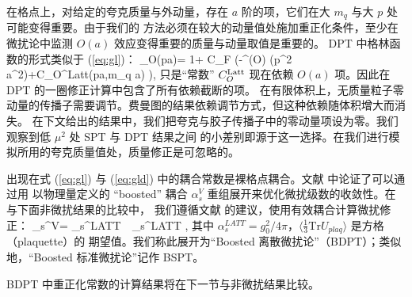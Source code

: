 在格点上，对给定的夸克质量与外动量，存在 $a$ 阶的项，它们在大 $m_q$ 与大 $p$ 处可能变得重要。由于我们的
方法必须在较大的动量值处施加重正化条件，至少在微扰论中监测 $O(a)$ 效应变得重要的质量与动量取值是重要的。
DPT 中格林函数的形式类似于 (\ref{eq:gl})：
\beq \Gamma_O(pa)=
  1+ C_F
\Bigl(-\gamma^{(O)} \ln (p^2 a^2)+C_O^{{\rm Latt}}(pa,m_q a)
 \Bigr), \label{eq:gld}\eeq
只是``常数'' $C_O^{{\rm Latt}}$ 现在依赖 $O(a)$ 项。因此在 DPT 的一圈修正计算中包含了所有依赖截断的项。
在有限体积上，无质量粒子零动量的传播子需要调节。费曼图的结果依赖调节方式，但这种依赖随体积增大而消失。
在下文给出的结果中，我们把夸克与胶子传播子中的零动量项设为零。我们观察到低 $\mu^2$ 处 SPT 与 DPT 结果之间
的小差别即源于这一选择。在我们进行模拟所用的夸克质量值处，质量修正是可忽略的。

出现在式 (\ref{eq:gl}) 与 (\ref{eq:gld}) 中的耦合常数是裸格点耦合。文献 \cite{lepage} 中论证了可以通过用
以物理量定义的 ``boosted'' 耦合 $\alpha_s^V$ 重组展开来优化微扰级数的收敛性。在与下面非微扰结果的比较中，
我们遵循文献 \cite{lepage} 的建议，使用有效耦合计算微扰修正：
\beq \alpha_s^V= 
 \alpha_s^{LATT} \,\, \alpha_s^{LATT} ,\eeq
其中 $\alpha_s^{LATT}=g_0^2/4 \pi$，$\langle \frac{1}{3}{\mathrm{Tr}} U_{plaq}\rangle$ 是方格（plaquette）的
期望值。我们称此展开为``Boosted 离散微扰论''（BDPT）；类似地，``Boosted 标准微扰论''记作 BSPT。

BDPT 中重正化常数的计算结果将在下一节与非微扰结果比较。
